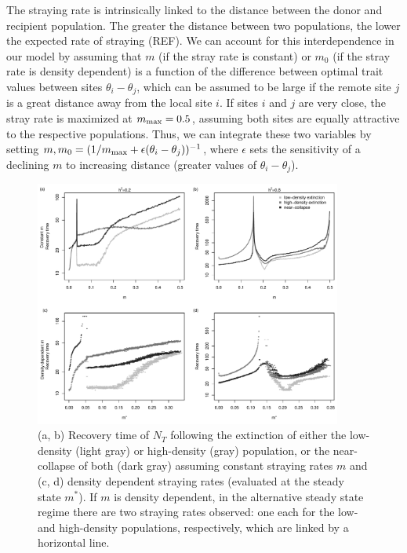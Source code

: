 \documentclass[twocolumn,preprintnumbers,amsmath,amssymb,superscriptaddress]{revtex4}
\begin{document}
The straying rate is intrinsically linked to the distance between the donor and recipient population.
The greater the distance between two populations, the lower the expected rate of straying (REF).
We can account for this interdependence in our model by assuming that $m$ (if the stray rate is constant) or $m_0$ (if the stray rate is density dependent) is a function of the difference between optimal trait values between sites $\theta_i-\theta_j$, which can be assumed to be large if the remote site $j$ is a great distance away from the local site $i$.
If sites $i$ and $j$ are very close, the stray rate is maximized at $m_{\rm max} = 0.5$, assuming both sites are equally attractive to the respective populations.
Thus, we can integrate these two variables by setting $m,m_0 = (1/m_{\rm max} + \epsilon (\theta_i-\theta_j))^{-1}$, where $\epsilon$ sets the sensitivity of a declining $m$ to increasing distance (greater values of $\theta_i-\theta_j$).

\begin{figure}
  \captionsetup{justification=raggedright,
singlelinecheck=false
}
\centering
\includegraphics[width=0.9\textwidth]{figs2/fig_relax_comb.pdf}
\caption{
(a, b) Recovery time of $N_T$ following the extinction of either the low-density (light gray) or high-density (gray) population, or the near-collapse of both (dark gray) assuming constant straying rates $m$ and (c, d) density dependent straying rates (evaluated at the steady state $m^*$).
If $m$ is density dependent, in the alternative steady state regime there are two straying rates observed: one each for the low- and high-density populations, respectively, which are linked by a horizontal line.
} \label{fig:relax}
\end{figure}
\end{document}
